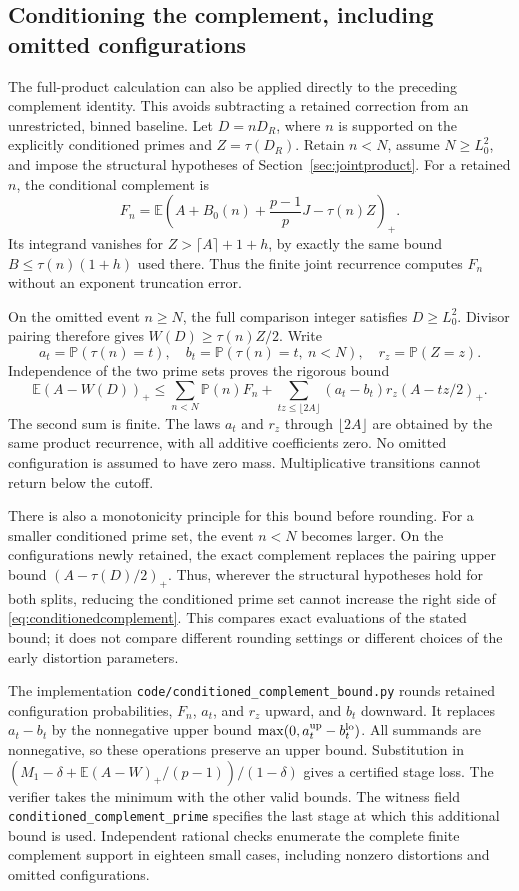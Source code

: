 \documentclass[11pt]{article}
\newcommand{\E}{\mathbb E}
\newcommand{\Pp}{\mathbb P}
\begin{document}
\subsection{Conditioning the complement, including omitted configurations}
\label{sec:conditionedcomplement}
The full-product calculation can also be applied directly to the preceding
complement identity. This avoids subtracting a retained correction from an
unrestricted, binned baseline. Let $D=nD_R$, where $n$ is supported on the
explicitly conditioned primes and $Z=\tau(D_R)$. Retain $n<N$, assume
$N\geq L_0^2$, and impose the structural hypotheses of
Section~\ref{sec:jointproduct}. For a retained $n$, the conditional
complement is
\[
 F_n=\E\left(A+B_0(n)+\frac{p-1}{p}J-\tau(n)Z\right)_+.
\]
Its integrand vanishes for $Z>\lceil A\rceil+1+h$, by exactly the same
bound $B\leq\tau(n)(1+h)$ used there. Thus the finite joint recurrence
computes $F_n$ without an exponent truncation error.

On the omitted event $n\geq N$, the full comparison integer satisfies
$D\geq L_0^2$. Divisor pairing therefore gives $W(D)\geq\tau(n)Z/2$.
Write
\[
 a_t=\Pp(\tau(n)=t),\quad
 b_t=\Pp(\tau(n)=t,\ n<N),\quad r_z=\Pp(Z=z).
\]
Independence of the two prime sets proves the rigorous bound
\begin{equation}\label{eq:conditionedcomplement}
 \E(A-W(D))_+
 \leq \sum_{n<N}\Pp(n)F_n
 +\sum_{tz\leq\lfloor2A\rfloor}(a_t-b_t)r_z
                       (A-tz/2)_+.
\end{equation}
The second sum is finite. The laws $a_t$ and $r_z$ through
$\lfloor2A\rfloor$ are obtained by the same product recurrence, with all
additive coefficients zero. No omitted configuration is assumed to have
zero mass. Multiplicative transitions cannot return below the cutoff.

There is also a monotonicity principle for this bound before rounding.
For a smaller conditioned prime set, the event $n<N$ becomes larger.
On the configurations newly retained, the exact complement replaces the
pairing upper bound $(A-\tau(D)/2)_+$. Thus, wherever the structural
hypotheses hold for both splits, reducing the conditioned prime set cannot
increase the right side of \eqref{eq:conditionedcomplement}. This compares
exact evaluations of the stated bound; it does not compare different
rounding settings or different choices of the early distortion parameters.

The implementation \texttt{code/conditioned\_complement\_bound.py}
rounds retained configuration probabilities, $F_n$, $a_t$, and $r_z$
upward, and $b_t$ downward. It replaces $a_t-b_t$ by the nonnegative
upper bound $\max(0,a_t^{\rm up}-b_t^{\rm lo})$. All summands are
nonnegative, so these operations preserve an upper bound. Substitution
in $(M_1-\delta+\E(A-W)_+/(p-1))/(1-\delta)$ gives a certified stage
loss. The verifier takes the minimum with the other valid bounds.
The witness field \texttt{conditioned\_complement\_prime} specifies the
last stage at which this additional bound is used. Independent rational
checks enumerate the complete finite complement support in eighteen
small cases, including nonzero distortions and omitted configurations.
\end{document}
